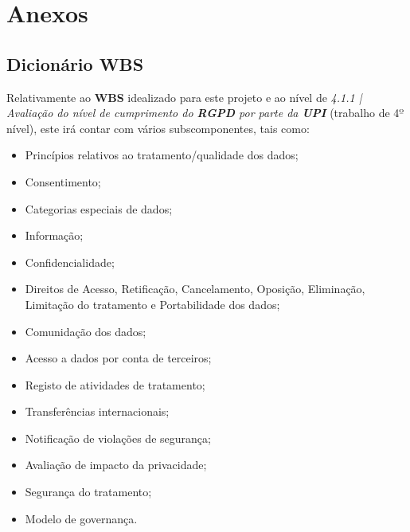 \section*{Anexos}

\subsection*{Dicionário WBS}

Relativamente ao \textbf{WBS} idealizado para este projeto e ao nível de \textit{4.1.1 | Avaliação do nível de cumprimento do \textbf{RGPD} por parte da \textbf{UPI}} (trabalho de 4$º$ nível), este irá contar com vários subscomponentes, tais como:

\begin{itemize}
	\item Princípios relativos ao tratamento/qualidade dos dados;
	\item Consentimento;
	\item Categorias especiais de dados;
	\item Informação;
	\item Confidencialidade;
	\item Direitos de Acesso, Retificação, Cancelamento, Oposição, Eliminação, Limitação do tratamento e Portabilidade dos dados;
	\item Comunidação dos dados;
	\item Acesso a dados por conta de terceiros;
	\item Registo de atividades de tratamento;
	\item Transferências internacionais;
	\item Notificação de violações de segurança;
	\item Avaliação de impacto da privacidade;
	\item Segurança do tratamento;
	\item Modelo de governança.
\end{itemize}